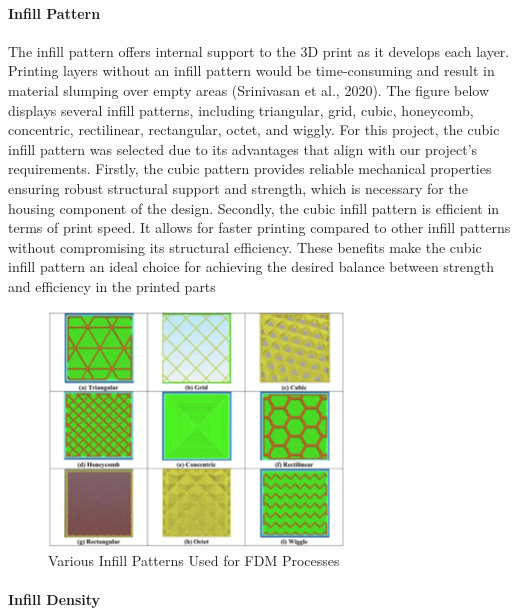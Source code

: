 \paragraph{Infill Pattern}

The infill pattern offers internal support to the 3D print as it develops each layer. 
Printing layers without an infill pattern would be time-consuming and result in material slumping over empty areas (Srinivasan et al., 2020). 
The figure below displays several infill patterns, including triangular, grid, cubic, honeycomb, concentric, rectilinear, rectangular, octet, and wiggly. 
For this project, the cubic infill pattern was selected due to its advantages that align with our project's requirements. 
Firstly, the cubic pattern provides reliable mechanical properties ensuring robust structural support and strength, which is necessary for the housing component of the design. 
Secondly, the cubic infill pattern is efficient in terms of print speed. 
It allows for faster printing compared to other infill patterns without compromising its structural efficiency. 
These benefits make the cubic infill pattern an ideal choice for achieving the desired balance between strength and efficiency in the printed parts

\begin{figure}[htbp]
    \centering
    \includegraphics[width=0.7\textwidth]{figures/CAD-3DPrint/infillPatterns.png}
    \caption{Various Infill Patterns Used for FDM Processes}
    \label{fig:infillpatterns}
    
\end{figure}

\paragraph{Infill Density}

